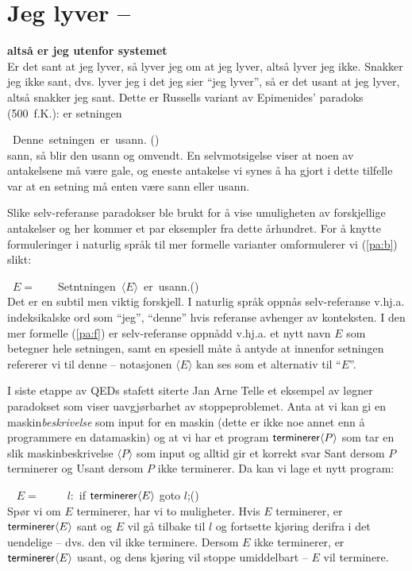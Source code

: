 \documentclass[10pt,twocolumn,leqno]{article}
\newcounter{EQ}
\newcommand{\equ}[1]{\refstepcounter{EQ}\vspace{.5ex}\par\noindent\ 
    \hfill #1\hfill{(\theEQ)}\\[.5ex]}
\newcommand{\refp}[1]{(\ref{#1})}
\newcommand{\<}{\langle}
\renewcommand{\>}{\rangle}
\begin{document}
\section{Jeg lyver --} \vspace*{-1ex}
\hfill{\Large\bf alts{\aa} er jeg utenfor systemet}\\[1ex]
Er det 
sant at jeg lyver, s{\aa} lyver jeg om at jeg lyver, alts{\aa} lyver jeg ikke. 
Snakker jeg ikke sant, dvs. lyver jeg i det jeg sier ``jeg 
lyver'', s{\aa} er det usant at jeg lyver, alts{\aa} snakker jeg 
sant. 
Dette er Russells variant av Epimenides' paradoks (500~f.K.): er setningen
\equ{Denne\ setningen\ er\ usann.
}\label{pa:b}
sann, s{\aa} blir den usann og omvendt.
En selvmotsigelse viser at noen av antakelsene m{\aa} v{\ae}re gale, og 
eneste antakelse vi synes {\aa} ha gjort i dette tilfelle var at en 
setning m{\aa} enten v{\ae}re sann eller usann. 

Slike selv-referanse paradokser ble brukt for {\aa} vise 
umuligheten av forskjellige antakelser og her kommer et par eksempler 
fra dette {\aa}rhundret.
For {\aa} knytte formuleringer i naturlig spr{\aa}k
til mer formelle varianter omformulerer vi \refp{pa:b} slikt:
\equ{$E=$\ \ \ \ Setntningen\ $\<E\>$\ er\ usann.}\label{pa:f}
Det er en subtil men viktig forskjell. 
I naturlig spr{\aa}k oppn{\aa}s selv-referanse
 v.hj.a. indeksikalske ord som ``jeg'', ``denne'' hvis 
referanse avhenger av konteksten. 
I den mer formelle \refp{pa:f} 
er selv-referanse oppn{\aa}dd v.hj.a. et nytt navn $E$ som 
betegner hele setningen, samt en spesiell m{\aa}te {\aa} antyde at innenfor 
setningen refererer vi til denne -- 
 notasjonen $\<E\>$ kan ses som et alternativ til ``$E$''.


I siste etappe av QEDs stafett siterte Jan Arne Telle et eksempel av 
l{\o}gner paradokset som viser uavgj{\o}rbarhet 
av stoppeproblemet. Anta at vi kan gi en maskin{\em beskrivelse} som input for en 
maskin (dette er ikke noe annet enn {\aa} programmere en
datamaskin) og at vi har et program ${\sf 
terminerer}\<P\>$ som tar en slik maskinbeskrivelse $\<P\>$ som input og 
alltid gir et korrekt svar {\sf Sant} dersom $P$ terminerer og {\sf 
Usant} 
dersom $P$ ikke terminerer. Da kan vi lage et nytt program:
\equ{ $E=$\ \ \ \ \ $l:$ if ${\sf terminerer}\<E\>$ goto 
$l$;}\label{pa:t}
Sp{\o}r vi om $E$ terminerer, har vi to muligheter. Hvis $E$ 
terminerer, er ${\sf terminerer}\<E\>$ sant og $E$ vil g{\aa} tilbake 
til $l$ og fortsette kj{\o}ring derifra i det uendelige -- dvs. den 
vil ikke terminere. Dersom $E$ ikke terminerer, er ${\sf 
terminerer}\<E\>$ usant, og dens kj{\o}ring vil stoppe umiddelbart -- 
 $E$ vil terminere.
\end{document}
